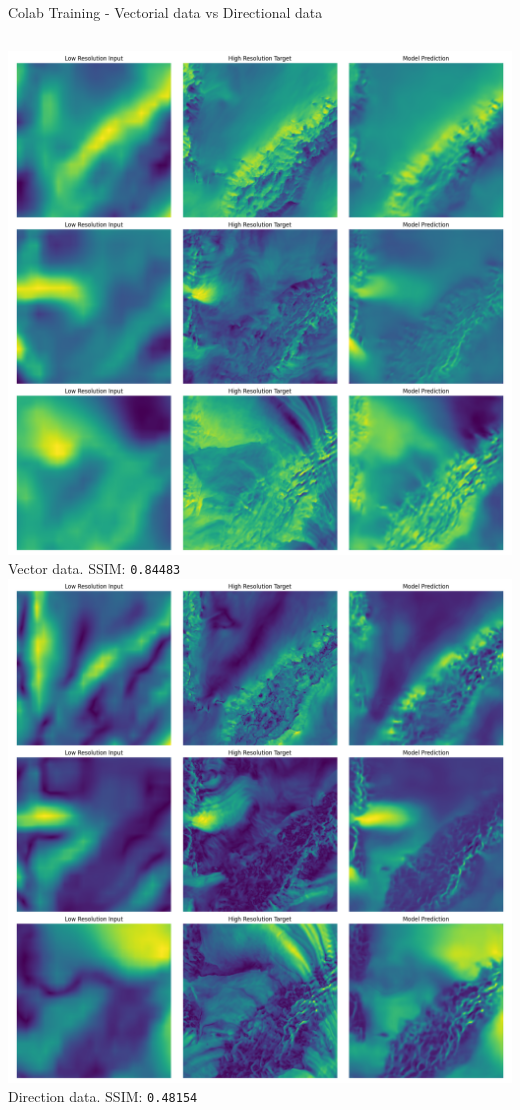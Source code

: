\documentclass[8pt]{beamer}
\begin{document}
\begin{frame}{Colab Training - Vectorial data vs Directional data}
    \begin{columns}
            \includegraphics[width=\linewidth]{images/colab_vector_unet_L1SSIM_loss_300_epochs_8_batch_1em3_lr_1em5_weightdecay_best.pt.png}
            \newline
            \centering \small Vector data. SSIM: \texttt{0.84483}
            \includegraphics[width=\linewidth]{images/colab_direction_unet_L1SSIM_loss_150_epochs_4_batch_1em3_lr_1em5_weightdecay_best.pt.png}
            \newline
            \centering \small Direction data. SSIM: \texttt{0.48154}
    \end{columns}
\end{frame}
\end{document}
